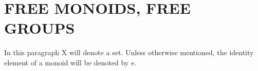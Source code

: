 \section{FREE MONOIDS, FREE GROUPS}

In this paragraph X will denote a set. Unless otherwise mentioned, the identity element of a monoid will be denoted by e.

